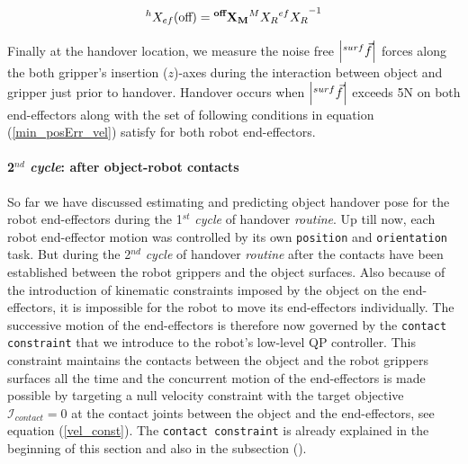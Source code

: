 \begin{equation}
	{}^{h}{X}_{ef}(\text{off}) =  {\bf{}^{\text{\bf off}}{X}_M}  {}^{M}{X}_R {{}^{ef}{X}_R}^{-1}
\end{equation}

Finally at the handover location, we measure the noise free $\abs{{}^{surf}\vec{f}}$ forces along the both gripper's insertion ($z$)-axes during the interaction between object and gripper just prior to handover. Handover occurs when $\abs{{}^{surf}\vec{f}}$ exceeds 5N on both end-effectors along with the set of following conditions in equation (\ref{min_posErr_vel}) satisfy for both robot end-effectors.


\paragraph*{2$^{nd}$ \textit{cycle}: after object-robot contacts}

So far we have discussed estimating and predicting object handover pose for the robot end-effectors during the 1${}^{st}$ \textit{cycle} of handover \textit{routine}. Up till now, each robot end-effector motion was controlled by its own \texttt{position} and \texttt{orientation} task. But during the 2$^{nd}$ \textit{cycle} of handover \textit{routine} after the contacts have been established between the robot grippers and the object surfaces. Also because of the introduction of kinematic constraints imposed by the object on the end-effectors, it is impossible for the robot to move its end-effectors individually. The successive motion of the end-effectors is therefore now governed by the \texttt{contact constraint} that we introduce to the robot's low-level QP controller. This constraint maintains the contacts between the object and the robot grippers surfaces all the time and the concurrent motion of the end-effectors is made possible by targeting a null velocity constraint with the target objective $\mathscr{I}_{contact}=0$ at the contact joints between the object and the end-effectors, see equation (\ref{vel_const}). The \texttt{contact constraint} is already explained in the beginning of this section and also in the subsection ().

